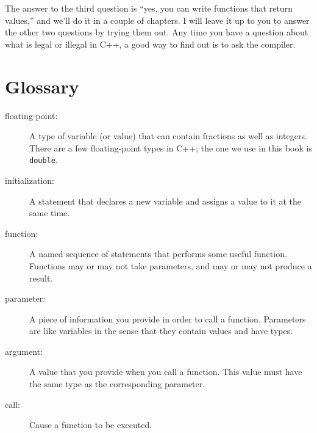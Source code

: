The answer to the third question is ``yes, you can write functions that
return values,'' and we'll do it in a couple of chapters.  I will
leave it up to you to answer the other two questions by trying them
out.  Any time you have a question about what is legal or
illegal in C++, a good way to find out is to ask the compiler.

\section{Glossary}

\begin{description}

\item[floating-point:] A type of variable (or value) that can contain
fractions as well as integers.  There are a few floating-point types
in C++; the one we use in this book is {\tt double}.

\item[initialization:]  A statement that declares a new variable
and assigns a value to it at the same time.

\item[function:]  A named sequence of statements that performs some
useful function.  Functions may or may not take parameters, and may
or may not produce a result.

\item[parameter:]  A piece of information you provide
in order to call a function.  Parameters are like variables in
the sense that they contain values and have types.

\item[argument:]  A value that you provide when you call a
function.  This value must have the same type as the corresponding
parameter.

\item[call:]  Cause a function to be executed.


\end{description}


